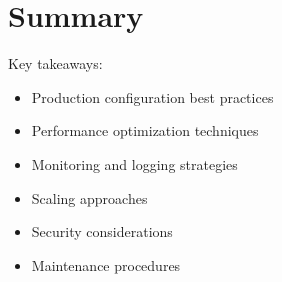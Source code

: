 \documentclass[12pt,a4paper]{book}
\begin{document}
	\section{Summary}
	Key takeaways:
	\begin{itemize}
		\item Production configuration best practices
		\item Performance optimization techniques
		\item Monitoring and logging strategies
		\item Scaling approaches
		\item Security considerations
		\item Maintenance procedures
	\end{itemize}
\end{document}
